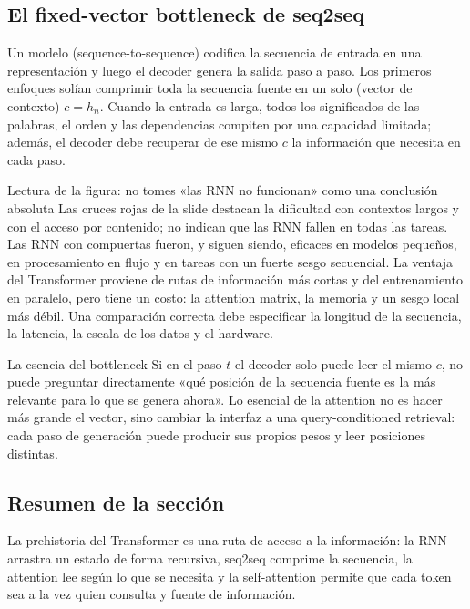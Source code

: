 
\subsection{El fixed-vector bottleneck de seq2seq}

Un modelo  (sequence-to-sequence) codifica la secuencia de entrada en una representación y luego el decoder genera la salida paso a paso. Los primeros enfoques solían comprimir toda la secuencia fuente en un solo  (vector de contexto) $c=h_n$. Cuando la entrada es larga, todos los significados de las palabras, el orden y las dependencias compiten por una capacidad limitada; además, el decoder debe recuperar de ese mismo $c$ la información que necesita en cada paso.


\begin{knowledgebox}{Lectura de la figura: no tomes «las RNN no funcionan» como una conclusión absoluta}
Las cruces rojas de la slide destacan la dificultad con contextos largos y con el acceso por contenido; no indican que las RNN fallen en todas las tareas. Las RNN con compuertas fueron, y siguen siendo, eficaces en modelos pequeños, en procesamiento en flujo y en tareas con un fuerte sesgo secuencial. La ventaja del Transformer proviene de rutas de información más cortas y del entrenamiento en paralelo, pero tiene un costo: la attention matrix, la memoria y un sesgo local más débil. Una comparación correcta debe especificar la longitud de la secuencia, la latencia, la escala de los datos y el hardware.
\end{knowledgebox}

\begin{importantbox}{La esencia del bottleneck}
Si en el paso $t$ el decoder solo puede leer el mismo $c$, no puede preguntar directamente «qué posición de la secuencia fuente es la más relevante para lo que se genera ahora». Lo esencial de la attention no es hacer más grande el vector, sino cambiar la interfaz a una query-conditioned retrieval: cada paso de generación puede producir sus propios pesos y leer posiciones distintas.
\end{importantbox}

\subsection{Resumen de la sección}

La prehistoria del Transformer es una ruta de acceso a la información: la RNN arrastra un estado de forma recursiva, seq2seq comprime la secuencia, la attention lee según lo que se necesita y la self-attention permite que cada token sea a la vez quien consulta y fuente de información.
